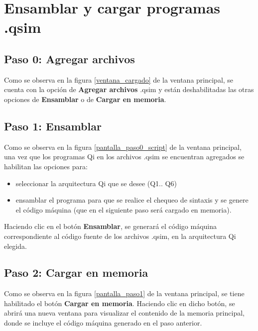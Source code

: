 
\newcommand{\funAgregar}{Agregar archivos}
\newcommand{\funEnsamblar}{Ensamblar}
\newcommand{\funCargar}{Cargar en memoria}

\section{Ensamblar y cargar programas .qsim}
\subsection{Paso 0: Agregar archivos}
Como se observa en la figura \ref{ventana_cargado} de la ventana principal, se cuenta con la opción de \textbf{\funAgregar} .qsim y están deshabilitadas las otras opciones de \textbf{\funEnsamblar} o de \textbf{\funCargar}.

\subsection{Paso 1: Ensamblar}
Como se observa en la figura \ref{pantalla_paso0_script} de la ventana principal, una vez que los programas Qi en los archivos .qsim se encuentran agregados se habilitan las opciones para:
\begin{itemize}
\item seleccionar la arquitectura Qi que se desee (Q1.. Q6)
\item ensamblar el programa para que se realice el chequeo de sintaxis y se genere el código máquina (que en el siguiente paso será cargado en memoria).
\end{itemize}  


Haciendo clic en el botón \textbf{\funEnsamblar}, se generará el código máquina correspondiente al código fuente de los archivos .qsim, en la arquitectura Qi elegida.

\subsection{Paso 2: Cargar en memoria}
Como se observa en la figura \ref{pantalla_paso1} de la ventana principal, se tiene habilitado el botón \textbf{\funCargar}. Haciendo clic en dicho botón, se abrirá una nueva ventana para visualizar el contenido de la memoria principal, donde se incluye el código máquina generado en el paso anterior.\\


